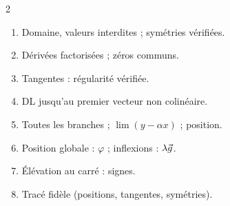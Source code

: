 \documentclass[a4paper,10pt]{article}
\begin{document}
\begin{multicols}{2}
\begin{REFL}
\begin{enumerate}
\item Domaine, valeurs interdites ; symétries vérifiées.
\item Dérivées factorisées ; zéros communs.
\item Tangentes : régularité vérifiée.
\item DL jusqu'au premier vecteur non colinéaire.
\item Toutes les branches ; $\lim(y-\alpha x)$ ; position.
\item Position globale : $\varphi$ ; inflexions : $\lambda\vec{g}$.
\item Élévation au carré : signes.
\item Tracé fidèle (positions, tangentes, symétries).
\end{enumerate}
\end{REFL}

\end{multicols}
\end{document}
